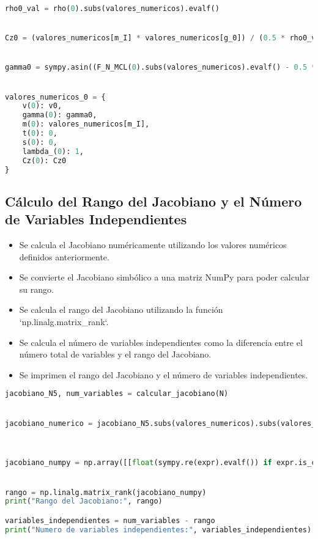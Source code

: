 \documentclass[fleqn]{article}
\begin{document}
\begin{lstlisting}[language=Python, firstnumber=last, style = mystyle]
rho0_val = rho(0).subs(valores_numericos).evalf()


Cz0 = (valores_numericos[m_I] * valores_numericos[g_0]) / (0.5 * rho0_val * v0**2 * valores_numericos[S_REF])


gamma0 = sympy.asin((F_N_MCL(0).subs(valores_numericos).evalf() - 0.5 * rho0_val * v0**2 * valores_numericos[S_REF] * (valores_numericos[Cx_0] + valores_numericos[k] * Cz0**2)) / (valores_numericos[m_I] * valores_numericos[g_0]))


valores_numericos_0 = {
    v(0): v0,
    gamma(0): gamma0,
    m(0): valores_numericos[m_I],
    t(0): 0,
    s(0): 0,
    lambda_(0): 1,
    Cz(0): Cz0
}
\end{lstlisting}



\subsection{Cálculo del Rango del Jacobiano y el Número de Variables Independientes}


\begin{itemize}
    \item Se calcula el Jacobiano numéricamente utilizando los valores numéricos definidos anteriormente.
    \item Se convierte el Jacobiano simbólico a una matriz NumPy para poder calcular su rango.
    \item Se calcula el rango del Jacobiano utilizando la función `np.linalg.matrix\_rank`.
    \item Se calcula el número de variables independientes como la diferencia entre el número total de variables y el rango del Jacobiano.
    \item Se imprimen el rango del Jacobiano y el número de variables independientes.
\end{itemize}

\begin{lstlisting}[language=Python, firstnumber=last, style = mystyle]
jacobiano_N5, num_variables = calcular_jacobiano(N)


jacobiano_numerico = jacobiano_N5.subs(valores_numericos).subs(valores_numericos_0)



jacobiano_numpy = np.array([[float(sympy.re(expr).evalf()) if expr.is_complex else float(expr.evalf()) if expr.is_number else float(sympy.re(expr.subs({s: 0 for s in expr.free_symbols})).evalf()) for expr in row] for row in jacobiano_numerico.tolist()], dtype=float)


rango = np.linalg.matrix_rank(jacobiano_numpy)
print("Rango del Jacobiano:", rango)

variables_independientes = num_variables - rango
print("Numero de variables independientes:", variables_independientes)
\end{lstlisting}
\end{document}
